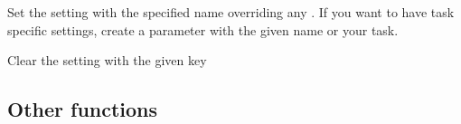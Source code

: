 \documentclass[letterpaper,10pt,english]{sphinxmanual}
\begin{document}

\begin{fulllineitems}
\label{\detokenize{documentation/api:b2luigi.set_setting}}
Set the setting with the specified name \sphinxhyphen{} overriding any .
If you want to have task specific settings, create a
parameter with the given name or your task.

\end{fulllineitems}


\begin{fulllineitems}
\label{\detokenize{documentation/api:b2luigi.clear_setting}}
Clear the setting with the given key

\end{fulllineitems}



\subsection{Other functions}
\label{\detokenize{documentation/api:other-functions}}
\end{document}

